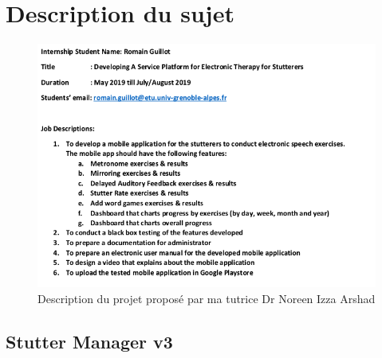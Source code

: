 \begin{appendices}

\chapter{Description du sujet}
\label{appendix:description}

\begin{figure}[h]
  \includegraphics[width=1\linewidth]{content/imgs/description.png}
  \caption*{Description du projet proposé par ma tutrice Dr Noreen Izza Arshad}
\end{figure}


\begin{landscape}
\chapter{Stutter Manager v3}
\label{appendix:old_app}


\end{landscape}
\end{appendices}
